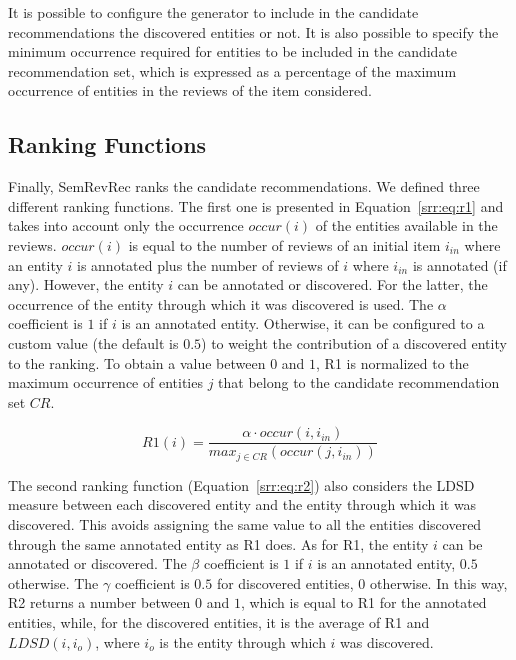 It is possible to configure the generator to include in the candidate recommendations the discovered entities or not. It is also possible to specify the minimum occurrence required for entities to be included in the candidate recommendation set, which is expressed as a percentage of the maximum occurrence of entities in the reviews of the item considered.

\subsection{Ranking Functions}
\label{srr:sec:ranking}

Finally, SemRevRec ranks the candidate recommendations. We defined three different ranking functions. The first one is presented in Equation~\ref{srr:eq:r1} and takes into account only the occurrence $occur(i)$ of the entities available in the reviews. $occur(i)$ is equal to the number of reviews of an initial item $i_{in}$ where an entity $i$ is annotated plus the number of reviews of $i$ where $i_{in}$ is annotated (if any). However, the entity $i$ can be annotated or discovered. For the latter, the occurrence of the entity through which it was discovered is used. The $\alpha$ coefficient is $1$ if $i$ is an annotated entity. Otherwise, it can be configured to a custom value (the default is $0.5$) to weight the contribution of a discovered entity to the ranking. To obtain a value between $0$ and $1$, R1 is normalized to the maximum occurrence of entities $j$ that belong to the candidate recommendation set $CR$.

\begin{equation}
\label{srr:eq:r1}
\mathit{R1}(i) = \frac{\alpha \cdot \mathit{occur(i, i_{in})}}{max_{j \in \mathit{CR}}(\mathit{occur(j, i_{in})})}
\end{equation}

The second ranking function (Equation~\ref{srr:eq:r2}) also considers the LDSD measure between each discovered entity and the entity through which it was discovered. This avoids assigning the same value to all the entities discovered through the same annotated entity as R1 does. 
As for R1, the entity $i$ can be annotated or discovered. The $\beta$ coefficient is $1$ if $i$ is an annotated entity, $0.5$ otherwise. The $\gamma$ coefficient is $0.5$ for discovered entities, $0$ otherwise. In this way, R2 returns a number between $0$ and $1$, which is equal to R1 for the annotated entities, while, for the discovered entities, it is the average of R1 and $LDSD(i,i_o)$, where $i_o$ is the entity through which $i$ was discovered.


